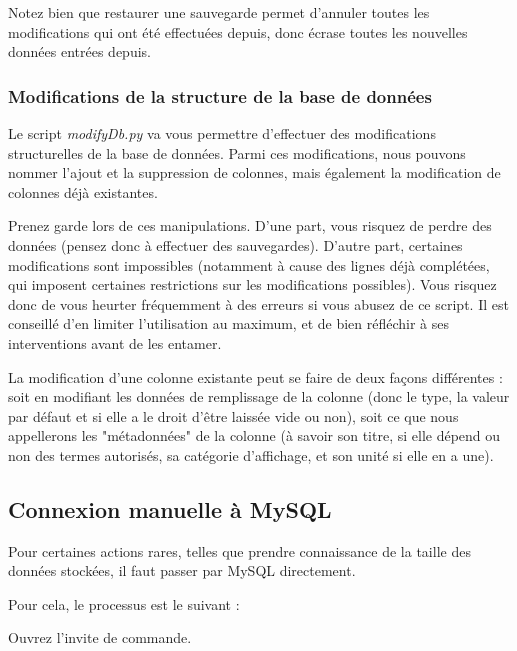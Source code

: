 \documentclass[12pt,a4paper]{article}
\begin{document}
            Notez bien que restaurer une sauvegarde permet d'annuler toutes les modifications qui ont été effectuées depuis,
            donc écrase toutes les nouvelles données entrées depuis.


        \bigskip
        \subsubsection{Modifications de la structure de la base de données}\label{modificationstructure}
            Le script \emph{modifyDb.py} va vous permettre d'effectuer des
            modifications structurelles de la base de données.
            Parmi ces modifications, nous pouvons nommer l'ajout et la suppression
            de colonnes, mais également la modification de colonnes déjà existantes.
            
            Prenez garde lors de ces manipulations. D'une part, vous risquez de perdre
            des données (pensez donc à effectuer des sauvegardes). D'autre part, certaines
            modifications sont impossibles (notamment à cause des lignes déjà complétées,
            qui imposent certaines restrictions sur les modifications possibles). Vous
            risquez donc de vous heurter fréquemment à des erreurs si vous abusez de ce script.
            Il est conseillé d'en limiter l'utilisation au maximum, et de bien réfléchir
            à ses interventions avant de les entamer.

            La modification d'une colonne existante peut se faire de deux façons différentes :
            soit en modifiant les données de remplissage de la colonne (donc le type, la valeur
            par défaut et si elle a le droit d'être laissée vide ou non), soit ce que nous
            appellerons les "métadonnées" de la colonne (à savoir son titre, si elle dépend
            ou non des termes autorisés, sa catégorie d'affichage, et son unité si elle
            en a une).


    \bigskip
    \subsection{Connexion manuelle à MySQL}\label{connexionmanuelle}
        Pour certaines actions rares, telles que prendre connaissance de la taille des
        données stockées, il faut passer par MySQL directement.

        Pour cela, le processus est le suivant : 

        Ouvrez l'invite de commande.
\end{document}
